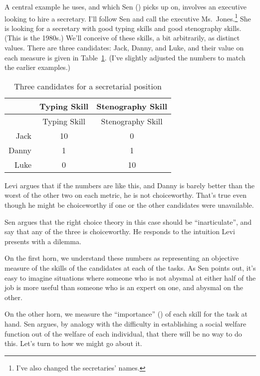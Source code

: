 \documentclass[
  11pt,
  letterpaper,
  DIV=11,
  numbers=noendperiod,
  twoside]{scrartcl}
\begin{document}
A central example he uses, and which Sen ()
picks up on, involves an executive looking to hire a secretary. I'll
follow Sen and call the executive Ms.~Jones.\footnote{I've also changed
  the secretaries' names.} She is looking for a secretary with good
typing skills and good stenography skills. (This is the 1980s.) We'll
conceive of these skills, a bit arbitrarily, as distinct values. There
are three candidates: Jack, Danny, and Luke, and their value on each
measure is given in Table~\ref{tbl-secretaries}. (I've slightly adjusted
the numbers to match the earlier examples.)

\begin{longtable}[]{@{}rcc@{}}
\caption{Three candidates for a secretarial
position}\label{tbl-secretaries}\tabularnewline
\toprule\noalign{}
& Typing Skill & Stenography Skill \\
\midrule\noalign{}
\endfirsthead
\toprule\noalign{}
& Typing Skill & Stenography Skill \\
\midrule\noalign{}
\endhead
\bottomrule\noalign{}
\endlastfoot
Jack & 10 & 0 \\
Danny & 1 & 1 \\
Luke & 0 & 10 \\
\end{longtable}

Levi argues that if the numbers are like this, and Danny is barely
better than the worst of the other two on each metric, he is not
choiceworthy. That's true even though he might be choiceworthy if one or
the other candidates were unavailable.

Sen argues that the right choice theory in this case should be
``inarticulate'', and say that any of the three is choiceworthy. He
responds to the intuition Levi presents with a dilemma.

On the first horn, we understand these numbers as representing an
objective measure of the skills of the candidates at each of the tasks.
As Sen points out, it's easy to imagine situations where someone who is
not abysmal at either half of the job is more useful than someone who is
an expert on one, and abysmal on the other.

On the other horn, we measure the ``importance''
() of each skill for the task at
hand. Sen argues, by analogy with the difficulty in establishing a
social welfare function out of the welfare of each individual, that
there will be no way to do this. Let's turn to how we might go about it.
\end{document}
